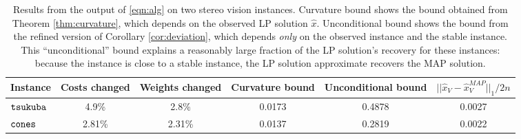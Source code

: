 \begin{table*}[ht]
     \centering
     \caption{Results from the output of \eqref{eqn:alg} on two stereo vision instances. Curvature bound shows the bound obtained from Theorem \ref{thm:curvature}, which depends on the observed LP solution $\hat{x}$. Unconditional bound shows the bound from the refined version of Corollary \ref{cor:deviation}, which depends \emph{only} on the observed instance and the stable instance. This ``unconditional'' bound explains a reasonably large fraction of the LP solution's recovery for these instances: because the instance is close to a stable instance, the LP solution approximate recovers the MAP solution.}
     \begin{tabular}{lccccc}
          Instance & Costs changed & Weights changed & Curvature bound & Unconditional bound & $||\hat{x}_V - \hat{x}^{MAP}_V||_1/2n$ \\
          \toprule
          ${\tt tsukuba}$ & 4.9\% & 2.8\% & 0.0173 & 0.4878 & 0.0027\\
          ${\tt cones}$ & 2.81\% & 2.31\% & 0.0137 & 0.2819 & 0.0022\\
          \bottomrule
     \end{tabular}
     \label{tbl:boundtable2}
 \end{table*}
